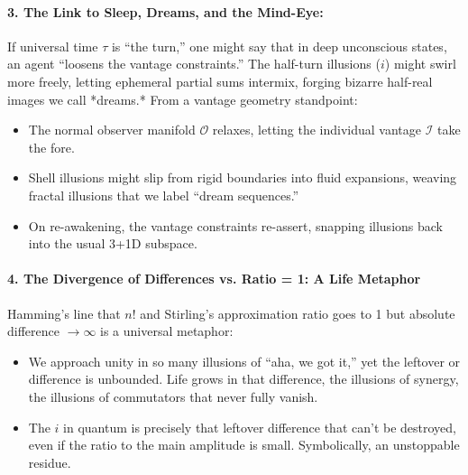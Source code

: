 \documentclass{article}
\begin{document}
\paragraph{3. The Link to Sleep, Dreams, and the Mind-Eye:}
If universal time $\tau$ is “the turn,” one might say that in deep unconscious states, an agent “loosens the vantage constraints.” The half-turn illusions ($i$) might swirl more freely, letting ephemeral partial sums intermix, forging bizarre half-real images we call *dreams.* From a vantage geometry standpoint:
\begin{itemize}
\item The normal observer manifold $\mathcal{O}$ relaxes, letting the individual vantage $\mathcal{I}$ take the fore.\vspace{-4pt}
\item Shell illusions might slip from rigid boundaries into fluid expansions, weaving fractal illusions that we label “dream sequences.”\vspace{-4pt}
\item On re-awakening, the vantage constraints re-assert, snapping illusions back into the usual 3+1D subspace.
\end{itemize}

\paragraph{4. The Divergence of Differences vs. Ratio = 1: A Life Metaphor}
Hamming’s line that $n!$ and Stirling’s approximation ratio goes to 1 but absolute difference $\to\infty$ is a universal metaphor:
\begin{itemize}
\item We approach unity in so many illusions of “aha, we got it,” yet the leftover or difference is unbounded. Life grows in that difference, the illusions of synergy, the illusions of commutators that never fully vanish.\vspace{-4pt}
\item The $i$ in quantum is precisely that leftover difference that can’t be destroyed, even if the ratio to the main amplitude is small. Symbolically, an unstoppable residue.
\end{itemize}
\end{document}

